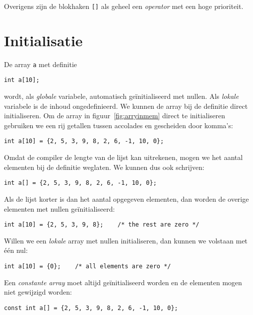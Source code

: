 Overigens zijn de blokhaken \texttt{[]} als geheel een \textsl{operator}\indexop{[]} met een hoge prioriteit.


\section{Initialisatie}
De array \texttt{a} met definitie

\begin{lstlisting}[style=lstoneline]
int a[10];
\end{lstlisting}

wordt, als \textsl{globale} variabele, automatisch geïnitialiseerd met nullen. Als \textsl{lokale} variabele is de inhoud ongedefinieerd. We kunnen de array bij de definitie direct initialiseren. Om de array in figuur~\ref{fig:arryinmem} direct te initialiseren gebruiken we een rij getallen tussen accolades en gescheiden door komma's:

\begin{lstlisting}[style=lstoneline]
int a[10] = {2, 5, 3, 9, 8, 2, 6, -1, 10, 0};
\end{lstlisting}

Omdat de compiler de lengte van de lijst kan uitrekenen, mogen we het aantal elementen bij de definitie weglaten. We kunnen dus ook schrijven:

\begin{lstlisting}[style=lstoneline]
int a[] = {2, 5, 3, 9, 8, 2, 6, -1, 10, 0};
\end{lstlisting}

Als de lijst korter is dan het aantal opgegeven elementen, dan worden de overige elementen met nullen geïnitialiseerd:

\begin{lstlisting}[style=lstoneline]
int a[10] = {2, 5, 3, 9, 8};    /* the rest are zero */
\end{lstlisting}

Willen we een \textsl{lokale} array met nullen initialiseren, dan kunnen we volstaan met één nul:

\begin{lstlisting}[style=lstoneline]
int a[10] = {0};    /* all elements are zero */
\end{lstlisting}

Een \textsl{constante array} moet altijd geïnitialiseerd worden en de elementen mogen niet gewijzigd worden:

\begin{lstlisting}[style=lstoneline]
const int a[] = {2, 5, 3, 9, 8, 2, 6, -1, 10, 0};
\end{lstlisting}



